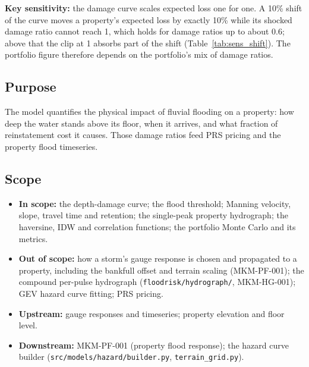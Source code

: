 \documentclass[11pt,a4paper]{article}
\begin{document}
\textbf{Key sensitivity:} the damage curve scales expected loss one for one. A 10\%
shift of the curve moves a property's expected loss by exactly 10\% while its shocked
damage ratio cannot reach 1, which holds for damage ratios up to about 0.6; above that
the clip at 1 absorbs part of the shift (Table~\ref{tab:sens_shift}). The portfolio
figure therefore depends on the portfolio's mix of damage ratios.

\mkmpurpose

\subsection{Purpose}
The model quantifies the physical impact of fluvial flooding on a property: how deep the
water stands above its floor, when it arrives, and what fraction of reinstatement cost it
causes. Those damage ratios feed PRS pricing and the property flood timeseries.

\subsection{Scope}
\begin{itemize}[nosep]
    \item \textbf{In scope:} the depth-damage curve; the flood threshold; Manning velocity,
          slope, travel time and retention; the single-peak property hydrograph; the
          haversine, IDW and correlation functions; the portfolio Monte Carlo and its
          metrics.
    \item \textbf{Out of scope:} how a storm's gauge response is chosen and propagated to
          a property, including the bankfull offset and terrain scaling (MKM-PF-001); the
          compound per-pulse hydrograph (\texttt{floodrisk/hydrograph/}, MKM-HG-001); GEV
          hazard curve fitting; PRS pricing.
    \item \textbf{Upstream:} gauge responses and timeseries; property elevation and floor
          level.
    \item \textbf{Downstream:} MKM-PF-001 (property flood response); the hazard curve
          builder (\texttt{src/models/hazard/builder.py}, \texttt{terrain\_grid.py}).
\end{itemize}

\mkmframework
\end{document}

